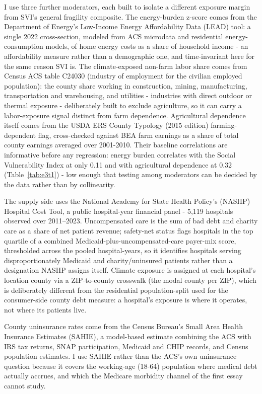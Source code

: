 \documentclass[a4paper,11pt]{report}
\begin{document}
I use three further moderators, each built to isolate a different exposure margin from SVI's general fragility composite. The energy-burden z-score comes from the Department of Energy's Low-Income Energy Affordability Data (LEAD) tool: a single 2022 cross-section, modeled from ACS microdata and residential energy-consumption models, of home energy costs as a share of household income - an affordability measure rather than a demographic one, and time-invariant here for the same reason SVI is. The climate-exposed non-farm labor share comes from Census ACS table C24030 (industry of employment for the civilian employed population): the county share working in construction, mining, manufacturing, transportation and warehousing, and utilities - industries with direct outdoor or thermal exposure - deliberately built to exclude agriculture, so it can carry a labor-exposure signal distinct from farm dependence. Agricultural dependence itself comes from the USDA ERS County Typology (2015 edition) farming-dependent flag, cross-checked against BEA farm earnings as a share of total county earnings averaged over 2001-2010. Their baseline correlations are informative before any regression: energy burden correlates with the Social Vulnerability Index at only 0.11 and with agricultural dependence at 0.32 (Table~\ref{tab:e3t1}) - low enough that testing among moderators can be decided by the data rather than by collinearity.



The supply side uses the National Academy for State Health Policy's (NASHP) Hospital Cost Tool, a public hospital-year financial panel - 5,119 hospitals observed over 2011--2023. Uncompensated care is the sum of bad debt and charity care as a share of net patient revenue; safety-net status flags hospitals in the top quartile of a combined Medicaid-plus-uncompensated-care payer-mix score, thresholded across the pooled hospital-years, so it identifies hospitals serving disproportionately Medicaid and charity/uninsured patients rather than a designation NASHP assigns itself. Climate exposure is assigned at each hospital's location county via a ZIP-to-county crosswalk (the modal county per ZIP), which is deliberately different from the residential population-split used for the consumer-side county debt measure: a hospital's exposure is where it operates, not where its patients live.

County uninsurance rates come from the Census Bureau's Small Area Health Insurance Estimates (SAHIE), a model-based estimate combining the ACS with IRS tax returns, SNAP participation, Medicaid and CHIP records, and Census population estimates. I use SAHIE rather than the ACS's own uninsurance question because it covers the working-age (18-64) population where medical debt actually accrues, and which the Medicare morbidity channel of the first essay cannot study.
\end{document}

